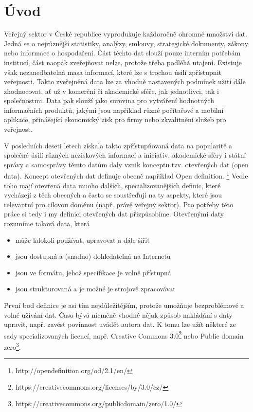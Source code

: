 \chapter*{Úvod}
Veřejný sektor v České republice vyprodukuje každoročně ohromné množství dat. Jedná se o nejrůznější statistiky, analýzy, smlouvy, strategické dokumenty, zákony nebo informace o hospodaření. Část těchto dat slouží pouze interním potřebám institucí, část naopak zveřejňovat nelze, protože třeba podléhá utajení. Existuje však nezanedbatelná masa informací, které lze s trochou úsilí zpřístupnit veřejnosti. Takto zveřejněná data lze za vhodně nastavených podmínek užití dále zhodnocovat, ať už v komerční či akademické sféře, jak jednotlivci, tak i společnostmi. Data pak slouží jako surovina pro vytváření hodnotných informačních produktů, jakými jsou například různé počítačové a mobilní aplikace, přinášející ekonomický zisk pro firmy nebo zkvalitnění služeb pro veřejnost.

V posledních deseti letech získala takto zpřístupňovaná data na popularitě a společné úsilí různých neziskových informací a iniciativ, akademické sféry i státní správy a samosprávy těmto datům daly vznik konceptu tzv. otevřených dat (open data). Koncept otevřených dat definuje obecně například Open definition. \footnote{http://opendefinition.org/od/2.1/en/} Vedle toho mají otevřená data mnoho dalších, specializovanějších definic, které vycházejí z těch obecných a často se soustřeďují na ty aspekty, které jsou relevantní pro cílovou doménu (např. právě veřejný sektor). Pro potřeby této práce si tedy i my definici otevřených dat přizpůsobíme. Otevřenými daty rozumíme taková data, která
\begin{itemize}
	\item může kdokoli používat, upravovat a dále šířit
	\item jsou dostupná a (snadno) dohledatelná na Internetu
	\item jsou ve formátu, jehož specifikace je volně přístupná
	\item jsou strukturovaná a je možné je strojově zpracovávat
\end{itemize}

První bod definice je asi tím nejdůležitějším, protože umožňuje bezproblémové a volné užívání dat. Časo bývá nicméně vhodné nějak způsob nakládání s daty upravit, např. zavést povinnost uvádět autora dat. K tomu lze užít některé ze sady specializovaných licencí, např. Creative Commons 3.0\footnote{https://creativecommons.org/licenses/by/3.0/cz/} nebo Public domain zero\footnote{https://creativecommons.org/publicdomain/zero/1.0/}.

